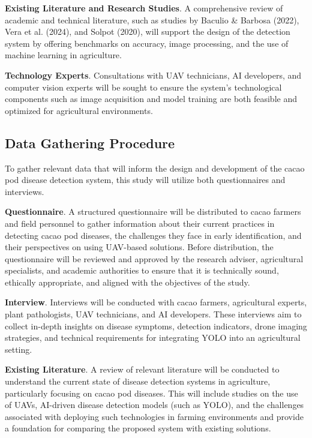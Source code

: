 \textbf{Existing Literature and Research Studies}. A comprehensive review of academic and technical literature, such as studies by Baculio \& Barbosa (2022), Vera et al. (2024), and Solpot (2020), will support the design of the detection system by offering benchmarks on accuracy, image processing, and the use of machine learning in agriculture.

\textbf{Technology Experts}. Consultations with UAV technicians, AI developers, and computer vision experts will be sought to ensure the system’s technological components such as image acquisition and model training are both feasible and optimized for agricultural environments.

\subsection{Data Gathering Procedure}

To gather relevant data that will inform the design and development of the cacao pod disease detection system, this study will utilize both questionnaires and interviews.

\textbf{Questionnaire}. A structured questionnaire will be distributed to cacao farmers and field personnel to gather information about their current practices in detecting cacao pod diseases, the challenges they face in early identification, and their perspectives on using UAV-based solutions. Before distribution, the questionnaire will be reviewed and approved by the research adviser, agricultural specialists, and academic authorities to ensure that it is technically sound, ethically appropriate, and aligned with the objectives of the study.

\textbf{Interview}. Interviews will be conducted with cacao farmers, agricultural experts, plant pathologists, UAV technicians, and AI developers. These interviews aim to collect in-depth insights on disease symptoms, detection indicators, drone imaging strategies, and technical requirements for integrating YOLO into an agricultural setting.

\textbf{Existing Literature}. A review of relevant literature will be conducted to understand the current state of disease detection systems in agriculture, particularly focusing on cacao pod diseases. This will include studies on the use of UAVs, AI-driven disease detection models (such as YOLO), and the challenges associated with deploying such technologies in farming environments and provide a foundation for comparing the proposed system with existing solutions.


